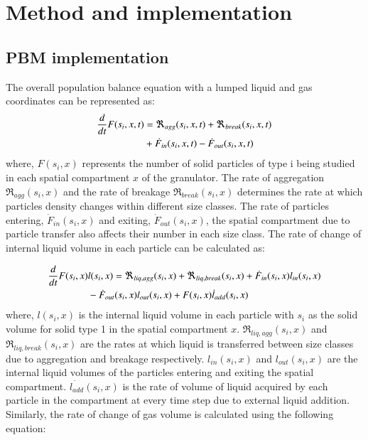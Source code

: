 \documentclass[preprint,10pt,authoryear,review]{elsarticle}
\begin{document}
\section{Method and implementation}
\label{secMethods}
\subsection{PBM implementation}
The overall population balance equation with a lumped liquid and gas coordinates can be represented as:
\begin{align}
\frac{d}{dt}F(s_i,x,t)&=\Re_{agg}(s_i,x,t)+\Re_{break}(s_i,x,t)\notag\\ 
&+\dot{F}_{in}(s_i,x,t)-\dot{F}_{out}(s_i,x,t)
\label{eqn:mthds_pbm_overall} 
\end{align}
where, $F(s_i,x)$ represents the number of solid particles of type i being studied in each spatial 
compartment $x$ of the granulator. The rate of aggregation $\Re_{agg}(s_i,x)$ 
and the rate of breakage $\Re_{break}(s_i,x)$ determines the rate at which particles density
changes within different size classes. The rate of particles entering, $\dot{F}_{in}(s_i,x)$ 
and exiting, $\dot{F}_{out}(s_i,x)$, the spatial compartment due to particle transfer also 
affects their number in each size class. The rate of change of internal liquid volume in each 
particle can be calculated as: 

\begin{align}
\frac{d}{dt}F(s_i,x)&l(s_i,x)= 
\Re_{liq,agg}(s_i,x)+\Re_{liq,break}(s_i,x)+\dot{F}_{in}(s_i,x)l_{in}(s_i,x)\notag\\
&-\dot{F}_{out}(s_i,x)l_{out}(s_i,x)+F(s_i,x)\dot{l}_{add}(s_i,x)
\label{eqn:mthds_pbm_rate} 
\end{align}
where, $l(s_i,x)$ is the internal liquid volume in each particle with ${s_i}$ as the 
solid volume for solid type 1 in the spatial compartment $x$. 
$\Re_{liq,agg}(s_i,x)$ and $\Re_{liq,break}(s_i,x)$ are the rates at which liquid is transferred 
between size classes due to aggregation and breakage respectively. $l_{in}(s_i,x)$ 
and $l_{out}(s_i,x)$ are the internal liquid volumes of the particles entering and exiting 
the spatial compartment. $\dot{l_{add}}(s_i,x)$ is the rate of volume of liquid acquired 
by each particle in the compartment at every time step due to external liquid addition.
Similarly, the rate of change of gas volume is calculated using the following equation: 
\end{document}
